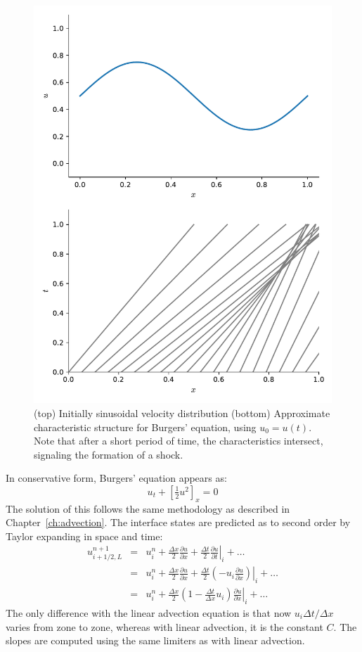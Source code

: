 \begin{figure}[t]
\centering
\includegraphics[width=0.6\linewidth]{burgers-characteristics}
\caption[Characteristics for shock initial conditions]
{\label{fig:burgers_char} (top) Initially sinusoidal
velocity distribution (bottom) Approximate characteristic
structure for Burgers' equation, using $u_0 = u(t)$.  Note that
after a short period of time, the characteristics intersect, signaling
the formation of a shock.}
\end{figure}



In conservative form, Burgers' equation appears as:
\begin{equation}
u_t + \left [\tfrac{1}{2} u^2 \right ]_x = 0
\end{equation}
The solution of this follows the same methodology as described in
Chapter~\ref{ch:advection}.  The interface states are predicted as to
second order by Taylor expanding in space and time:
\begin{eqnarray}
u^{n+1}_{i+1/2,L}
 &=& u^n_i + \frac{\Delta x}{2} \frac{\partial u}{\partial x}
    + \frac{\Delta t}{2} \left . \frac{\partial u}{\partial t} \right |_i
    + \ldots \\
 &=& u^n_i + \frac{\Delta x}{2} \frac{\partial u}{\partial x}
    + \frac{\Delta t}{2} \left . \left (-u_i \frac{\partial u}{\partial x}
         \right ) \right |_i
    + \ldots \\
 &=& u^n_i + \frac{\Delta x}{2}
   \left ( 1 - \frac{\Delta t}{\Delta x} u_i \right )
   \left . \frac{\partial u}{\partial x} \right |_i + \ldots
\end{eqnarray}
The only difference with the linear advection equation is that now
$u_i \Delta t/\Delta x$ varies from zone to zone, whereas with linear
advection, it is the constant $C$.  The slopes are computed using
the same limiters as with linear advection.

